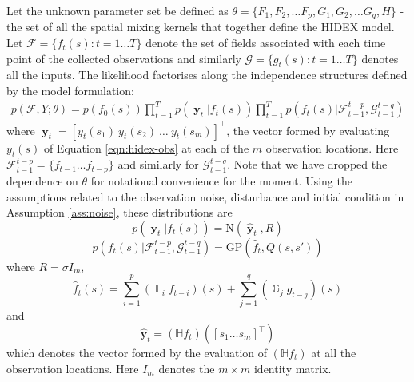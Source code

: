 \documentclass{IEEEtran}
\newcommand{\GP}[2]{\mathrm{GP}(#1,#2)}
\newcommand{\N}[2]{\mathrm{N}(#1,#2)}
\DeclareMathOperator{\F}{\mathbb{F}}
\DeclareMathOperator{\G}{\mathbb{G}}
\DeclareMathOperator{\yvec}{\mathbf{y}}
\begin{document}
Let the unknown parameter set be defined as $\theta = \{F_1, F_2, \ldots F_p, G_1,G_2,\ldots G_q, H\}$ - the set of all the spatial mixing kernels that together define the HIDEX model. Let $\mathcal{F} = \{f_t(s) : t = 1 \ldots T\}$ denote the set of fields associated with each time point of the collected observations and similarly $\mathcal{G} = \{g_t(s) : t = 1 \ldots T\}$ denotes all the inputs. The likelihood factorises along the independence structures defined by the model formulation:
\begin{equation}
	\begin{split}
	p(\mathcal{F}, Y;\theta) =  p(f_0(s)) \prod_{t=1}^T p(\yvec_t|f_t(s))
	\prod_{t=1}^T  p(f_t(s)|\mathcal{F}_{t-1}^{t-p}, \mathcal{G}_{t-1}^{t-q}) 
	\end{split}
\end{equation}
where $\yvec_t = [y_t(s_1) ~ y_t(s_2) ~ \ldots ~ y_t(s_m)]^\top$, the vector formed by evaluating $y_t(s)$ of Equation \ref{eqn:hidex-obs} at each of the $m$ observation locations. Here $\mathcal{F}_{t-1}^{t-p} = \{f_{t-1} \ldots f_{t-p}\}$ and similarly for $\mathcal{G}_{t-1}^{t-q}$. Note that we have dropped the dependence on $\theta$ for notational convenience for the moment. Using the assumptions related to the observation noise, disturbance and initial condition in Assumption \ref{ass:noise}, these distributions are
\begin{equation}
	\label{eqn:ydist}
	p(\yvec_t|f_t(s)) = \N{\hat{\yvec}_t}{R}
\end{equation}
\begin{equation}
	\label{eqn:fdist}
	p(f_t(s)|\mathcal{F}_{t-1}^{t-p}, \mathcal{G}_{t-1}^{t-q}) = \GP{ \hat{f}_t}{Q(s,s')}
\end{equation}
where $R = \sigma I_m$,
\begin{equation}
	\hat{f}_t(s) =\sum_{i=1}^{p}( \F_i f_{t-i})(s) + \sum_{j=1}^{q}(\G_j g_{t-j})(s)
\end{equation}
and 
\begin{equation}
	\hat{\mathbf{y}}_t = (\mathbb{H}f_t)([s_1 \ldots s_m]^\top)
\end{equation}
which denotes the vector formed by the evaluation of $(\mathbb{H}f_t)$ at all the observation locations. Here $I_m$ denotes the $m\times m$ identity matrix.
\end{document}
